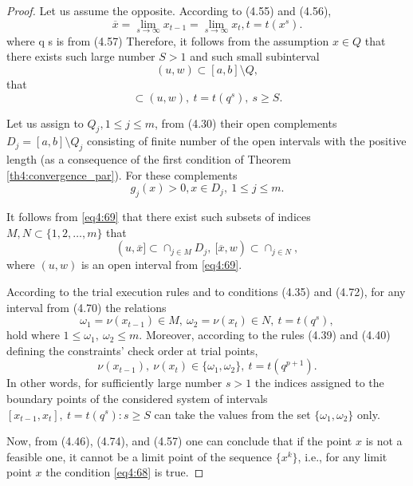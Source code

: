 \begin{proof}
  Let us assume the opposite. According to (4.55) and (4.56),
  \begin{displaymath}
    \overline x = \lim_{s\to\infty}x_{t-1}=\lim_{s\to\infty}x_t, t=t(x^s).
  \end{displaymath}
  where q s is from (4.57) Therefore, it follows from the assumption $x\in Q$ that there exists such large number $S>1$ and such small subinterval
  \begin{equation}
    \label{eq4:69}
    (u,w)\subset[a,b]\setminus Q,
  \end{equation}
  that
  \begin{equation}
    [x_{t-1},x_t]\subset(u,w),\:t=t(q^s),\:s\ge S.
  \end{equation}

  Let us assign to $Q_j, 1\le j\le m$, from (4.30) their open complements $D_j=[a,b]\setminus Q_j$ consisting of finite number of the open intervals with the positive length (as a consequence of the first condition of Theorem \ref{th4:convergence_par}). For these complements
  \begin{equation}
    g_j(x)>0,x\in D_j,\:1\le j\le m.
  \end{equation}

  It follows from \eqref{eq4:69} that there exist such subsets of indices $M,N\subset\{1,2,\dots,m\}$ that
  \begin{equation}
    (u,\overline x]\subset \cap_{j\in M}D_j,\:[\overline x,w)\subset \cap_{j\in N},
  \end{equation}
  where $(u,w)$ is an open interval from \eqref{eq4:69}.

  According to the trial execution rules and to conditions (4.35) and (4.72), for any interval from (4.70) the relations
  \begin{displaymath}
    \omega_1=\nu(x_{t-1})\in M,\: \omega_2=\nu(x_t)\in N,\:t=t(q^s),
  \end{displaymath}
  hold where $1\le \omega_1,\: \omega_2\le m$. Moreover, according to the rules (4.39) and (4.40) defining the constraints’ check order at trial points,
  \begin{displaymath}
    \nu(x_{t-1}),\:\nu(x_t)\in\{\omega_1,\omega_2\},\: t=t(q^{p+1}).
  \end{displaymath}
  In other words, for sufficiently large number $s>1$ the indices assigned to the boundary points of the considered system of intervals $[x_{t-1},x_t],\: t=t(q^s ): s\ge S$ can take the values from the set $\{\omega_1,\omega_2\}$ only.

  Now, from (4.46), (4.74), and (4.57) one can conclude that if the point $x$ is not a feasible one, it cannot be a limit point of the sequence $\{x^k\}$, i.e., for any limit point $x$ the condition \eqref{eq4:68} is true.
\end{proof}


